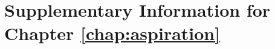 \chapter{Supplementary Information for Chapter \ref{chap:aspiration}}

\graphicspath{{aspiration/figures/}}


